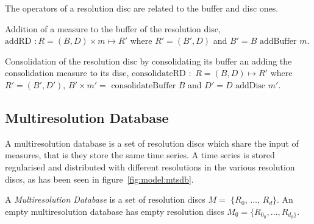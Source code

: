 
The operators of a resolution disc are related to
the buffer and disc ones.

Addition of a measure to the
buffer of the resolution disc, $\text{addRD } : R=(B,D) \times m \mapsto R'$ where
$R'= (B',D)$ and $B'= B \text{ addBuffer } m$.

Consolidation of the resolution disc by consolidating its buffer an adding the
consolidation measure to its disc,
$\text{consolidateRD } :$ $R=(B,D) \mapsto R'$ where $R'=
(B',D')$, $B' \times m'= \text{ consolidateBuffer } B $ and $ D'= D
\text{ addDisc } m'$.




\subsection{Multiresolution Database}\label{sec:model:rrd}

A multiresolution database is a set of resolution discs which
share the input of measures, that is they store the same time
series. A time series is stored regularised and distributed with
different resolutions in the various resolution discs, as has been seen
in figure~\ref{fig:model:mtsdb}.

\begin{definition}
  A \emph{Multi\-re\-solution Database} is a set of resolution discs $M=$
  $\{R_0,$\,$\dotsc,$\,$R_d\}$.  An empty multiresolution database has
  empty resolution discs
  $M_{\emptyset}=\{R_{0_{\emptyset}},\dotsc,R_{d_{\emptyset}\}}$.
\end{definition}


 


